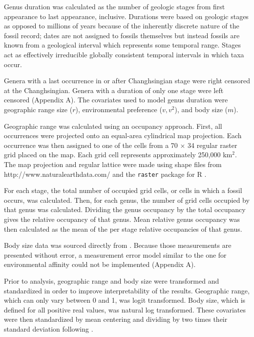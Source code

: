 \documentclass{article}
\begin{document}
Genus duration was calculated as the number of geologic stages from first appearance to last appearance, inclusive. Durations were based on geologic stages as opposed to millions of years because of the inherently discrete nature of the fossil record; dates are not assigned to fossils themselves but instead fossils are known from a geological interval which represents some temporal range. Stages act as effectively irreducible globally consistent temporal intervals in which taxa occur.

Genera with a last occurrence in or after Changhsingian stage were right censored at the Changhsingian. Genera with a duration of only one stage were left censored (Appendix A). The covariates used to model genus duration were geographic range size (\(r\)), environmental preference (\(v, v^{2}\)), and body size (\(m\)). 

Geographic range was calculated using an occupancy approach. First, all occurrences were projected onto an equal-area cylindrical map projection. Each occurrence was then assigned to one of the cells from a 70 \(\times\) 34 regular raster grid placed on the map. Each grid cell represents approximately 250,000 km\(^{2}\). The map projection and regular lattice were made using shape files from http://www.naturalearthdata.com/ and the \texttt{raster} package for R \citep{raster}.

For each stage, the total number of occupied grid cells, or cells in which a fossil occurs, was calculated. Then, for each genus, the number of grid cells occupied by that genus was calculated. Dividing the genus occupancy by the total occupancy gives the relative occupancy of that genus. Mean relative genus occupancy was then calculated as the mean of the per stage relative occupancies of that genus. 

Body size data was sourced directly from \citet{Payne2014}. Because those measurements are presented without error, a measurement error model similar to the one for environmental affinity could not be implemented (Appendix A).

Prior to analysis, geographic range and body size were transformed and standardized in order to improve interpretability of the results. Geographic range, which can only vary between 0 and 1, was logit transformed. Body size, which is defined for all positive real values, was natural log transformed. These covariates were then standardized by mean centering and dividing by two times their standard deviation following \citet{Gelman2007}.
\end{document}
